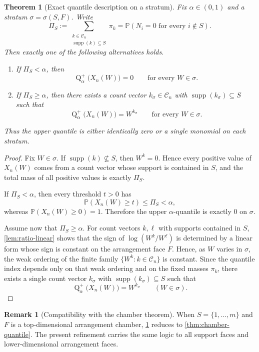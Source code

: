 \documentclass[11pt]{article}
\newtheorem{theorem}{Theorem}[section]
\theoremstyle{definition}
\newtheorem{remark}[remark]{Remark}
\newcommand{\Prob}{\mathbb{P}}
\newcommand{\1}{\mathbf{1}}
\newcommand{\supp}{\operatorname{supp}}
\newcommand{\Quant}{\operatorname{Q}}
\begin{document}
\begin{theorem}[Exact quantile description on a stratum]\label{thm:stratum-quantile}
Fix $\alpha\in(0,1)$ and a stratum $\sigma=\sigma(S,F)$. Write
\[
\Pi_S:=\sum_{\substack{k\in\mathcal C_n\\ \supp(k)\subseteq S}} \pi_k
=
\Prob(N_i=0\text{ for every } i\notin S).
\]
Then exactly one of the following alternatives holds.
\begin{enumerate}[label=(\alph*), itemsep=3pt]
  \item If $\Pi_S<\alpha$, then
  \[
  \Quant_\alpha^+\bigl(X_n(W)\bigr)=0
  \qquad\text{for every } W\in\sigma.
  \]
  \item If $\Pi_S\ge \alpha$, then there exists a count vector $k_\sigma\in\mathcal C_n$ with $\supp(k_\sigma)\subseteq S$ such that
  \[
  \Quant_\alpha^+\bigl(X_n(W)\bigr)=W^{k_\sigma}
  \qquad\text{for every } W\in\sigma.
  \]
\end{enumerate}
Thus the upper quantile is either identically zero or a single monomial on each stratum.
\end{theorem}

\begin{proof}
Fix $W\in\sigma$. If $\supp(k)\not\subseteq S$, then $W^k=0$. Hence every positive value of $X_n(W)$ comes from a count vector whose support is contained in $S$, and the total mass of all positive values is exactly $\Pi_S$.

If $\Pi_S<\alpha$, then every threshold $t>0$ has
\[
\Prob(X_n(W)\ge t)\le \Pi_S<\alpha,
\]
whereas $\Prob(X_n(W)\ge 0)=1$. Therefore the upper $\alpha$-quantile is exactly $0$ on $\sigma$.

Assume now that $\Pi_S\ge \alpha$. For count vectors $k,\ell$ with supports contained in $S$, \cref{lem:ratio-linear} shows that the sign of $\log(W^k/W^\ell)$ is determined by a linear form whose sign is constant on the arrangement face $F$. Hence, as $W$ varies in $\sigma$, the weak ordering of the finite family $\{W^k:k\in\mathcal C_n\}$ is constant. Since the quantile index depends only on that weak ordering and on the fixed masses $\pi_k$, there exists a single count vector $k_\sigma$ with $\supp(k_\sigma)\subseteq S$ such that
\[
\Quant_\alpha^+\bigl(X_n(W)\bigr)=W^{k_\sigma}
\qquad (W\in\sigma).
\]
\end{proof}

\begin{remark}[Compatibility with the chamber theorem]
When $S=\{1,\dots,m\}$ and $F$ is a top-dimensional arrangement chamber, \cref{thm:stratum-quantile} reduces to \cref{thm:chamber-quantile}. The present refinement carries the same logic to all support faces and lower-dimensional arrangement faces.
\end{remark}
\end{document}
